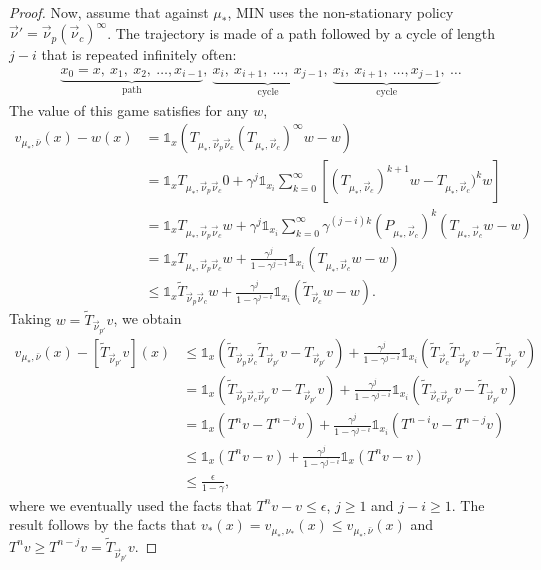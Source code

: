 \documentclass{article}
\def\1{{\mathds 1}}
\begin{document}
\begin{proof}
  Now, assume that against $\mu_*$, MIN uses the non-stationary policy $\vec\nu'=\vec\nu_p(\vec\nu_c)^\infty$. The trajectory is made of a path followed by a cycle of length $j-i$ that is repeated infinitely often:
  \begin{align}
    \underbrace{x_0=x,~ x_1,~ x_2,~ \dots, x_{i-1}}_{\mbox{path}},~ \underbrace{x_i,~ x_{i+1},~ \dots,~ x_{j-1}}_{\mbox{cycle}},~ \underbrace{x_i,~ x_{i+1},~ \dots, x_{j-1}}_{\mbox{cycle}}, ~\dots
  \end{align}
  The value of this game satisfies for any $w$,
  \begin{align}
    v_{\mu_*,\bar\nu}(x) - w(x)& = \1_x (T_{\mu_*,\vec\nu_p\vec\nu_c} (T_{\mu_*,\vec\nu_c})^\infty w - w)\\
    & = \1_x  T_{\mu_*,\vec\nu_p\vec\nu_c} 0 + \gamma^{j} \1_{x_i} \sum_{k=0}^{\infty} [(T_{\mu_*,\vec\nu_c})^{k+1} w - T_{\mu_*,\vec\nu_c})^k w] \\
    & = \1_x  T_{\mu_*,\vec\nu_p\vec\nu_c} w + \gamma^{j} \1_{x_i} \sum_{k=0}^{\infty} \gamma^{(j-i)k}(P_{\mu_*,\vec\nu_c})^k (T_{\mu_*,\vec\nu_c} w -  w)  \\
    &=\1_x  T_{\mu_*,\vec\nu_p\vec\nu_c} w + \frac{\gamma^{j}}{1-\gamma^{j-i}}\1_{x_i} (T_{\mu_*,\vec\nu_c} w -  w)  \\
    &\le \1_x  \tilde T_{\vec\nu_p\vec\nu_c} w + \frac{\gamma^{j}}{1-\gamma^{j-i}}\1_{x_i} (\tilde T_{\vec\nu_c} w -  w).
  \end{align}
  Taking $w = \tilde T_{\vec\nu_{p'}}v$, we obtain
  \begin{align}
    v_{\mu_*,\bar\nu}(x) - [ \tilde T_{\vec\nu_{p'}}v](x) & \le \1_x  (\tilde T_{\vec\nu_p\vec\nu_c} \tilde T_{\vec\nu_{p'}}v-T_{\vec\nu_{p'}}v) + \frac{\gamma^{j} }{1-\gamma^{j-i}}\1_{x_i} ( \tilde T_{\vec\nu_c} \tilde T_{\vec\nu_{p'}}v - \tilde T_{\vec\nu_{p'}} v )\\
    & = \1_x  (\tilde T_{\vec\nu_p\vec\nu_c\vec\nu_{p'}}v - T_{\vec\nu_{p'}}v)+ \frac{\gamma^{j} }{1-\gamma^{j-i}} \1_{x_i}(\tilde T_{\vec\nu_c\vec\nu_{p'}}v -  \tilde T_{\vec\nu_{p'}} v ) \\
    & = \1_x (T^nv - T^{n-j}v) + \frac{\gamma^{j}}{1-\gamma^{j-i}}  \1_{x_i} (T^{n-i}v -  T^{n-j}v ) \\
    & \le \1_x (T^nv - v) + \frac{\gamma^{j}}{1-\gamma^{j-i}}  \1_x (T^n v - v) \\
    & \le \frac{\epsilon}{1-\gamma},
  \end{align}
  where we eventually used the facts that $T^nv - v \le \epsilon$, $j \ge 1$ and $j-i \ge 1$.
The result follows by the facts that $v_*(x) = v_{\mu_*,\nu_*}(x) \le v_{\mu_*,\bar\nu}(x)$ and $T^n v \ge T^{n-j}v = \tilde T_{\vec\nu_{p'}}v$.
\end{proof}
\end{document}
